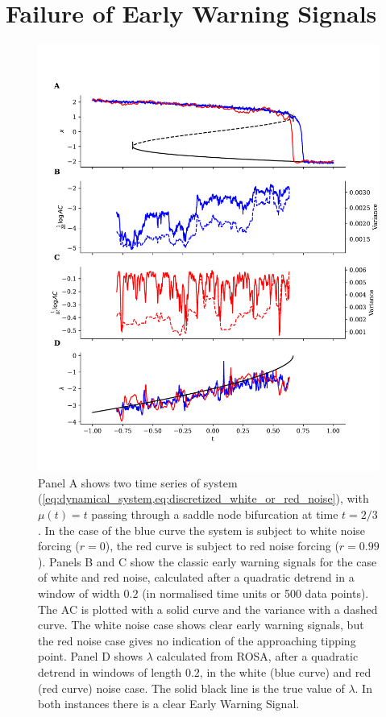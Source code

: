 \section{Failure of Early Warning Signals}\label{sec:failure}
\begin{figure}
\includegraphics[width=\textwidth,keepaspectratio]{figure1}
\caption[Early Warning Signals Failing]
{Panel A shows two time series of system (\cref{eq:dynamical_system,eq:discretized_white_or_red_noise}), with $\mu(t)=t$ passing through a saddle node bifurcation at time $t=2/3$. 
  In the case of the blue curve the system
  is subject to white noise forcing ($r=0$), the red curve is subject to 
  red noise forcing ($r=0.99$). Panels B and C show the
  classic early warning signals for the case of white and
  red noise, calculated after a
  quadratic detrend in a window of width $0.2$ (in normalised time units or 500 data points).
  The AC is plotted with a solid curve and
  the variance with a 
  dashed curve.
  The white noise case shows clear early warning signals, 
  but the red noise case gives no indication of the approaching tipping point. Panel D shows $\lambda$ calculated from ROSA, after a
  quadratic detrend in windows of length $0.2$, in the
  white (blue curve) and red (red curve) noise case. The solid black 
  line is the true value of $\lambda$. In both instances there
  is a clear Early Warning Signal.}\label{fig:failure_of_ews}
\end{figure}

